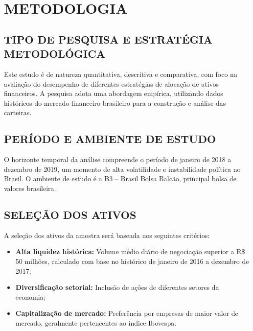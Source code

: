 
\chapter{METODOLOGIA}

\section{TIPO DE PESQUISA E ESTRATÉGIA METODOLÓGICA}

Este estudo é de natureza quantitativa, descritiva e comparativa, com foco na avaliação do desempenho de diferentes estratégias de alocação de ativos financeiros. A pesquisa adota uma abordagem empírica, utilizando dados históricos do mercado financeiro brasileiro para a construção e análise das carteiras.

\section{PERÍODO E AMBIENTE DE ESTUDO}

O horizonte temporal da análise compreende o período de janeiro de 2018 a dezembro de 2019, um momento de alta volatilidade e instabilidade política no Brasil. O ambiente de estudo é a B3 -- Brasil Bolsa Balcão, principal bolsa de valores brasileira.

\section{SELEÇÃO DOS ATIVOS}

A seleção dos ativos da amostra será baseada nos seguintes critérios:

\begin{itemize}
    \item \textbf{Alta liquidez histórica:} Volume médio diário de negociação superior a R\$ 50 milhões, calculado com base no histórico de janeiro de 2016 a dezembro de 2017;
    
    \item \textbf{Diversificação setorial:} Inclusão de ações de diferentes setores da economia;
    
    \item \textbf{Capitalização de mercado:} Preferência por empresas de maior valor de mercado, geralmente pertencentes ao índice Ibovespa.
\end{itemize}

